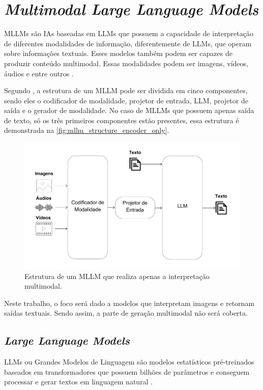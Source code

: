\section{\textit{Multimodal Large Language Models}}

\acp{MLLM} são \acp{IA} baseadas em \acp{LLM} que possuem a capacidade de interpretação de diferentes modalidades de informação, diferentemente de \acp{LLM}, que
operam sobre informações textuais. Esses modelos também podem ser capazes de produzir conteúdo multimodal. Essas modalidades podem ser imagens, vídeos, áudios e
entre outros \cite{mllm_survey_2023, mllm_survey_2024}.

Segundo \textcite{mllm_survey_2024}, a estrutura de um \ac{MLLM} pode ser dividida em cinco componentes, sendo eles o codificador de modalidade, projetor de entrada,
\ac{LLM}, projetor de saída e o gerador de modalidade. No caso de \acp{MLLM} que possuem apenas saída de texto, só os três primeiros componentes estão presentes,
essa estrutura é demonstrada na \autoref{fig:mllm_structure_encoder_only}.

\begin{figure}[ht]
      \centering
      \includegraphics[width=0.7\columnwidth,keepaspectratio]{images/mllm_structure_encoder_only.pdf}
      \caption{\small Estrutura de um \ac{MLLM} que realiza apenas a interpretação multimodal.}
      \label{fig:mllm_structure_encoder_only}
\end{figure}

Neste trabalho, o foco será dado a modelos que interpretam imagens e retornam saídas textuais. Sendo assim, a parte de geração multimodal não será coberta.

\subsection{\textit{Large Language Models}}

\acp{LLM} ou Grandes Modelos de Linguagem são modelos estatísticos pré-treinados baseados em transformadores que possuem bilhões de parâmetros e conseguem processar e
gerar textos em linguagem natural \cite{llm_survey_2024}.

